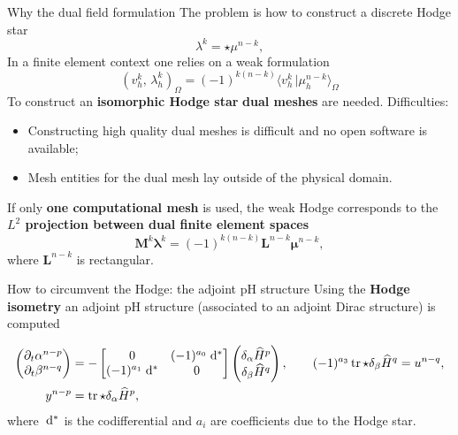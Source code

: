 \documentclass[aspectratio=169]{beamer}
\DeclareMathOperator{\tr}{tr}
\newcommand{\inpr}[3][]{\ensuremath{( #2, \, #3 )_{#1}}}
\newcommand{\dualpr}[3][]{\ensuremath{\langle #2 \, \vert #3 \rangle_{#1}}}
\newcommand*{\dual}[1]{\ensuremath{\widehat{#1}}}
\begin{document}
\begin{frame}{Why the dual field formulation}
	The problem is how to construct a discrete Hodge star
	\begin{equation*}
		\lambda^k = \star \mu^{n-k}, 
	\end{equation*}
	In a finite element context one relies on a weak formulation
	\begin{equation*}
			\inpr[\Omega]{v^k_h}{\lambda^k_h} = (-1)^{k(n-k)}\dualpr[\Omega]{v^k_h}{\mu^{n-k}_h}
	\end{equation*}
	To construct an \textbf{isomorphic Hodge star} \textbf{dual meshes} are needed. Difficulties:
	\begin{itemize}
		\item Constructing high quality dual meshes is difficult and no open software is available;
		\item Mesh entities for the dual mesh lay outside of the physical domain.
	\end{itemize}
	


	If only \textbf{one computational mesh} is used, the weak Hodge corresponds to the \textbf{$L^2$ projection between dual finite element spaces}
	\begin{equation*}
	 \mathbf{M}^k \bm{\lambda}^k =(-1)^{k(n-k)} \mathbf{L}^{n-k} \bm{\mu}^{n-k},
	\end{equation*}
	where $\mathbf{L}^{n-k}$ is rectangular.
\end{frame}


\begin{frame}{How to circumvent the Hodge: the adjoint pH structure}
	Using the \textbf{Hodge isometry} an adjoint pH structure (associated to an adjoint Dirac structure) is computed
	
	\begin{tcolorbox}[nobeforeafter, colframe=theme,title=Adjoint pH system]%
	\begin{equation*}
		\begin{aligned}
			\begin{pmatrix}
				\partial_t {\alpha}^{n-p} \\
				\partial_t {\beta}^{n-q} \\
			\end{pmatrix} &= -
			\begin{bmatrix}
				0 &  (-1)^{a_0}\d{}^* \\
				(-1)^{a_1}\d{}^* & 0 \\
			\end{bmatrix}
			\begin{pmatrix}
				\delta_{\alpha} \dual{H}^p \\
				\delta_{{\beta}} \dual{H}^q
			\end{pmatrix}, \qquad (-1)^{a_3}\tr \star \delta_{{\beta}} \dual{H}^q= u^{n-q}, \\
			y^{n-p} &= \tr \star \delta_{\alpha} \dual{H}^p,
		\end{aligned}
	\end{equation*}
	where $\d{}^{*}$ is the codifferential and $a_i$ are coefficients due to the Hodge star.
	\end{tcolorbox} 

\end{frame}
	
\end{document}
